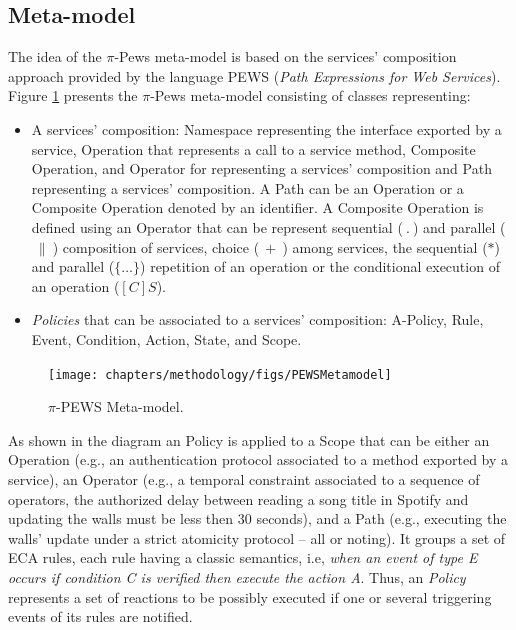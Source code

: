 \subsection{Meta-model}


The idea of the $\pi$-{\sc Pews} meta-model is based on the services'
composition approach provided by the language PEWS
\cite{BHM06,Placido2010LTPD} (\textit{Path Expressions for Web Services}).
Figure \ref{fig:metamodel} presents the $\pi$-{\sc Pews} meta-model consisting of  classes representing:

\begin{itemize}
\item A services' composition: {\sc Namespace} representing the interface exported by a service, {\sc Operation} that represents a call to a service method, {\sc Composite Operation}, and  {\sc Operator} for representing a services' composition and {\sc Path} representing a services' composition.
A {\sc Path} can be an {\sc Operation} or a {\sc Composite Operation}
denoted by an identifier. A {\sc Composite Operation} is defined using an  {\sc Operator}  that can be represent  sequential ($\ . \ $) and parallel ($\ \| \ $) composition of services,
choice ($\ + \ $) among services,
the sequential ($*$) and parallel ($\{\dots\}$) repetition of an operation or the conditional execution of an operation ($[C]S$).

\item {\em Policies} that can be associated to a services' composition:  {\sc A-Policy}, {\sc Rule}, {\sc Event}, {\sc Condition}, {\sc Action}, {\sc State}, and {\sc Scope}.
\end{itemize}
 
\begin{figure}[ht!]
\centering
\texttt{[image: chapters/methodology/figs/PEWSMetamodel]}
\caption{$\pi$-PEWS Meta-model.}
\label{fig:metamodel}
\end{figure}

As shown in the diagram an {\sc Policy} is applied to a {\sc Scope} that can be
either an {\sc Operation} (e.g., an authentication protocol associated to a
method exported by a service),  an {\sc Operator} (e.g., a temporal constraint
associated to a sequence of operators, the authorized delay between reading a
song title in Spotify and updating the walls must be less then 30 seconds), and
a {\sc Path} (e.g., executing the walls' update under a strict atomicity
protocol -- all or noting).  It groups a set of ECA rules, each rule having a
classic semantics, i.e, {\em when an event of type E occurs if  condition C is
verified then execute the action A}.  Thus, an {\em Policy} represents a set of
reactions to be possibly executed if one or several triggering events of its
rules are notified.

